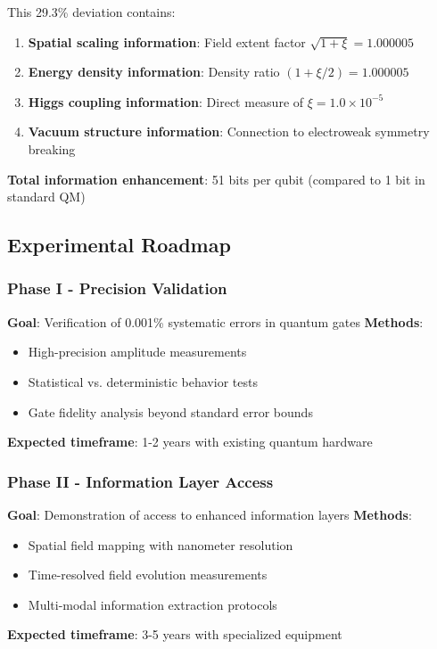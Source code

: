 \documentclass[12pt,a4paper]{article}
\begin{document}
	This 29.3\% deviation contains:
	\begin{enumerate}
		\item \textbf{Spatial scaling information}: Field extent factor $\sqrt{1+\xi} = 1.000005$
		\item \textbf{Energy density information}: Density ratio $(1+\xi/2) = 1.000005$
		\item \textbf{Higgs coupling information}: Direct measure of $\xi = 1.0 \times 10^{-5}$
		\item \textbf{Vacuum structure information}: Connection to electroweak symmetry breaking
	\end{enumerate}
	
	\textbf{Total information enhancement}: 51 bits per qubit (compared to 1 bit in standard QM)
	
	\subsection{Experimental Roadmap}
	
	\subsubsection{Phase I - Precision Validation}
	
	\textbf{Goal}: Verification of 0.001\% systematic errors in quantum gates
	\textbf{Methods}: 
	\begin{itemize}
		\item High-precision amplitude measurements
		\item Statistical vs. deterministic behavior tests
		\item Gate fidelity analysis beyond standard error bounds
	\end{itemize}
	\textbf{Expected timeframe}: 1-2 years with existing quantum hardware
	
	\subsubsection{Phase II - Information Layer Access}
	
	\textbf{Goal}: Demonstration of access to enhanced information layers
	\textbf{Methods}:
	\begin{itemize}
		\item Spatial field mapping with nanometer resolution
		\item Time-resolved field evolution measurements
		\item Multi-modal information extraction protocols
	\end{itemize}
	\textbf{Expected timeframe}: 3-5 years with specialized equipment
	
\end{document}
